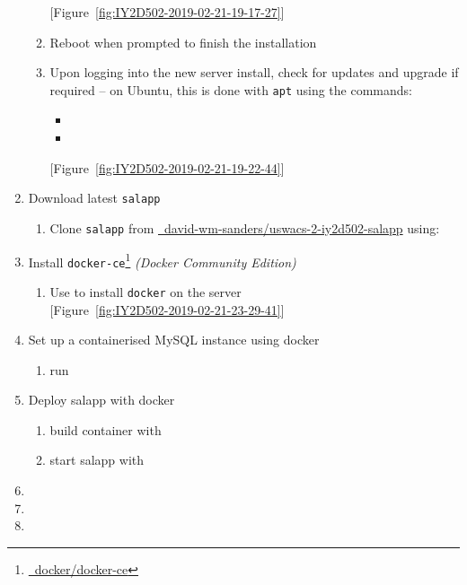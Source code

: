\begin{enumerate}
\begin{enumerate}[label=\roman*\textasciitilde]
      \textcolor{nicer-blue}{[Figure~\ref{fig:IY2D502-2019-02-21-19-17-27}]}
      \item Reboot when prompted to finish the installation
      \item Upon logging into the new server install, check for updates and upgrade if required -- on Ubuntu, this is done with \texttt{apt} using the commands:
        \begin{itemize}
          \item {}
          \item {}
        \end{itemize}
      \textcolor{nicer-blue}{[Figure~\ref{fig:IY2D502-2019-02-21-19-22-44}]}
    \end{enumerate}
  \item Download latest \texttt{salapp}
    \begin{enumerate}[label=\roman*\textasciitilde]
      \item Clone \texttt{salapp} from \href{https://github.com/david-wm-sanders/uswacs-2-iy2d502-salapp}{\faGithub\ david-wm-sanders/uswacs-2-iy2d502-salapp} using:\\
    \end{enumerate}
  \item Install \texttt{docker-ce}\footnote{\href{https://github.com/docker/docker-ce}{\faGithub\ docker/docker-ce}} \textit{(Docker Community Edition)}
    \begin{enumerate}[label=\roman*\textasciitilde]
      \item Use  to install \texttt{docker} on the server\\
      \textcolor{nicer-blue}{[Figure~\ref{fig:IY2D502-2019-02-21-23-29-41}]}
    \end{enumerate}
  \item Set up a containerised MySQL instance using docker
    \begin{enumerate}[label=\roman*\textasciitilde]
      \item run  
    \end{enumerate}
  \item Deploy salapp with docker
    \begin{enumerate}[label=\roman*\textasciitilde~]
      \item build container with  
      \item start salapp with  
    \end{enumerate}
  \item {}
  \item {}
  \item {}
\end{enumerate}
